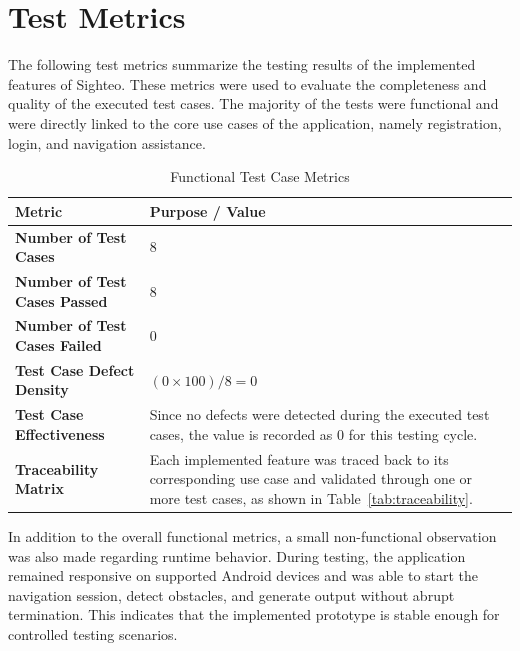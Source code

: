 \documentclass{FastFyp}
\begin{document}
\clearpage
\section{Test Metrics}

The following test metrics summarize the testing results of the implemented features of Sighteo. These metrics were used to evaluate the completeness and quality of the executed test cases. The majority of the tests were functional and were directly linked to the core use cases of the application, namely registration, login, and navigation assistance.

\begin{table}[!ht]
\centering
\caption{Functional Test Case Metrics}
\small
\begin{tabular}{|p{5.5cm}|p{8.5cm}|}
\hline
\textbf{Metric} & \textbf{Purpose / Value} \\ \hline
\textbf{Number of Test Cases} & 8 \\ \hline
\textbf{Number of Test Cases Passed} & 8 \\ \hline
\textbf{Number of Test Cases Failed} & 0 \\ \hline
\textbf{Test Case Defect Density} & $(0 \times 100)/8 = 0$ \\ \hline
\textbf{Test Case Effectiveness} & Since no defects were detected during the executed test cases, the value is recorded as 0 for this testing cycle. \\ \hline
\textbf{Traceability Matrix} & Each implemented feature was traced back to its corresponding use case and validated through one or more test cases, as shown in Table~\ref{tab:traceability}. \\ \hline
\end{tabular}
\label{tab:functional_metrics}
\end{table}

In addition to the overall functional metrics, a small non-functional observation was also made regarding runtime behavior. During testing, the application remained responsive on supported Android devices and was able to start the navigation session, detect obstacles, and generate output without abrupt termination. This indicates that the implemented prototype is stable enough for controlled testing scenarios.
\end{document}
